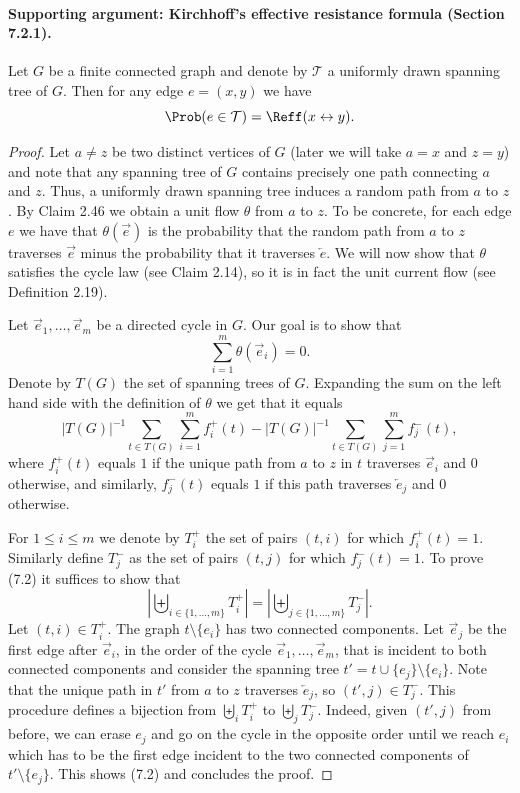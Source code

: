 \paragraph{Supporting argument: Kirchhoff's effective resistance formula (Section 7.2.1).}
\begin{theorem}[7.2, Kirchoff]
Let $G$ be a finite connected graph and denote by $\mathcal T$ a uniformly drawn spanning tree of $G$. Then for any edge $e=(x,y)$ we have
\[
\Prob(e\in\mathcal T)=\Reff(x\leftrightarrow y).
\]
\end{theorem}
\begin{proof}
Let $a\ne z$ be two distinct vertices of $G$ (later we will take $a=x$ and $z=y$) and note that any spanning tree of $G$ contains precisely one path connecting $a$ and $z$. Thus, a uniformly drawn spanning tree induces a random path from $a$ to $z$. By Claim 2.46 we obtain a unit flow $\theta$ from $a$ to $z$.
To be concrete, for each edge $e$ we have that $\theta(\vec e)$ is the probability that the random path from $a$ to $z$ traverses $\vec e$ minus the probability that it traverses $\overleftarrow e$. We will now show that $\theta$ satisfies the cycle law (see Claim 2.14), so it is in fact the unit current flow (see Definition 2.19).

Let $\vec e_1,\ldots,\vec e_m$ be a directed cycle in $G$. Our goal is to show that
\[
\sum_{i=1}^m\theta(\vec e_i)=0.\tag{7.2}
\]
Denote by $T(G)$ the set of spanning trees of $G$. Expanding the sum on the left hand side with the definition of $\theta$ we get that it equals
\[
|T(G)|^{-1}\sum_{t\in T(G)}\sum_{i=1}^m f_i^+(t)
-|T(G)|^{-1}\sum_{t\in T(G)}\sum_{j=1}^m f_j^-(t),
\]
where $f_i^+(t)$ equals $1$ if the unique path from $a$ to $z$ in $t$ traverses $\vec e_i$ and $0$ otherwise, and similarly, $f_j^-(t)$ equals $1$ if this path traverses $\overleftarrow e_j$ and $0$ otherwise.

For $1\le i\le m$ we denote by $T_i^+$ the set of pairs $(t,i)$ for which $f_i^+(t)=1$. Similarly define $T_j^-$ as the set of pairs $(t,j)$ for which $f_j^-(t)=1$. To prove (7.2) it suffices to show that
\[
\left|\biguplus_{i\in\{1,\ldots,m\}}T_i^+\right|
=\left|\biguplus_{j\in\{1,\ldots,m\}}T_j^-\right|.
\]
Let $(t,i)\in T_i^+$. The graph $t\setminus\{e_i\}$ has two connected components. Let $\vec e_j$ be the first edge after $\vec e_i$, in the order of the cycle $\vec e_1,\ldots,\vec e_m$, that is incident to both connected components and consider the spanning tree $t'=t\cup\{e_j\}\setminus\{e_i\}$. Note that the unique path in $t'$ from $a$ to $z$ traverses $\overleftarrow e_j$, so $(t',j)\in T_j^-$. This procedure defines a bijection from $\biguplus_i T_i^+$ to $\biguplus_j T_j^-$.
Indeed, given $(t',j)$ from before, we can erase $e_j$ and go on the cycle in the opposite order until we reach $e_i$ which has to be the first edge incident to the two connected components of $t'\setminus\{e_j\}$. This shows (7.2) and concludes the proof.
\end{proof}

